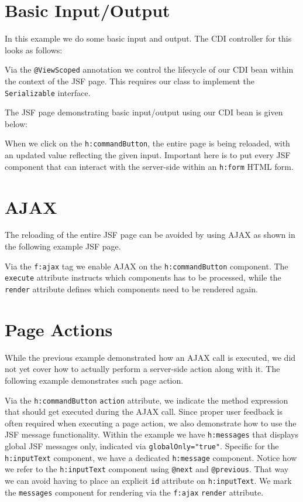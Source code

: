 \section{Basic Input/Output}
\label{sec:basic-input-output}

In this example we do some basic input and output.
The CDI controller for this looks as follows:

Via the \texttt{@ViewScoped} annotation we control the lifecycle of our CDI bean within the context of the JSF page.
This requires our class to implement the \texttt{Serializable} interface.

The JSF page demonstrating basic input/output using our CDI bean is given below:

When we click on the \texttt{h:commandButton}, the entire page is being reloaded, with an updated value reflecting the given input.
Important here is to put every JSF component that can interact with the server-side within an \texttt{h:form} HTML form.


\section{AJAX}

The reloading of the entire JSF page can be avoided by using AJAX as shown in the following example JSF page.

Via the \texttt{f:ajax} tag we enable AJAX on the \texttt{h:commandButton} component.
The \texttt{execute} attribute instructs which components has to be processed, while the \texttt{render} attribute defines which components need to be rendered again.


\section{Page Actions}
While the previous example demonstrated how an AJAX call is executed, we did not yet cover how to actually perform a server-side action along with it.
The following example demonstrates such page action.

Via the \texttt{h:commandButton} \texttt{action} attribute, we indicate the method expression that should get executed during the AJAX call.
Since proper user feedback is often required when executing a page action, we also demonstrate how to use the JSF message functionality.
Within the example we have \texttt{h:messages} that displays global JSF messages only,
indicated via \texttt{globalOnly="true"}.
Specific for the \texttt{h:inputText} component, we have a dedicated \texttt{h:message} component.
Notice how we refer to the \texttt{h:inputText} component using \texttt{@next} and \texttt{@previous}.
That way we can avoid having to place an explicit \texttt{id} attribute on \texttt{h:inputText}.
We mark the \texttt{messages} component for rendering via the \texttt{f:ajax} \texttt{render} attribute.

